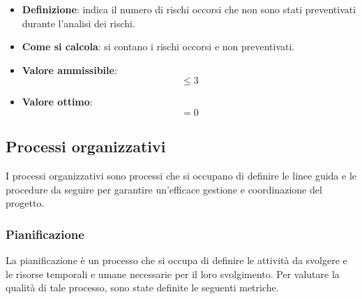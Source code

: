 \begin{itemize}
	\item \textbf{Definizione}: indica il numero di rischi occorsi che non sono stati preventivati durante l'analisi dei rischi.
	\item \textbf{Come si calcola}: si contano i rischi occorsi e non preventivati.
	\item \textbf{Valore ammissibile}: \begin{equation*}\leq 3\end{equation*}
	\item \textbf{Valore ottimo}: \begin{equation*}= 0\end{equation*}
\end{itemize}




\subsection{Processi organizzativi}
I processi organizzativi sono processi che si occupano di definire le linee guida e le procedure da seguire per garantire un'efficace gestione e coordinazione del progetto.

\subsubsection{Pianificazione}
La pianificazione è un processo che si occupa di definire le attività da svolgere e le risorse temporali e umane necessarie per il loro svolgimento. Per valutare la qualità di tale processo, sono state definite le seguenti metriche.

